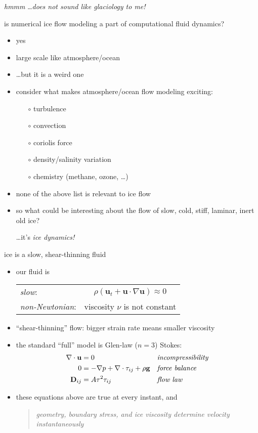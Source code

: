 \begin{frame}{\emph{hmmm} \dots \emph{does not sound like glaciology to me!}}

is numerical ice flow modeling a part of computational fluid dynamics?

\begin{itemize}
\item \alert{yes}
\item large scale like atmosphere/ocean
\item \dots but it is a weird one
\item consider what makes atmosphere/ocean flow modeling exciting:
  \begin{itemize}
  \item[$\circ$] turbulence
  \item[$\circ$] convection
  \item[$\circ$] coriolis force
  \item[$\circ$] density/salinity variation
  \item[$\circ$] chemistry (methane, ozone, \dots)
  \end{itemize}
\item none of the above list is relevant to ice flow
\item so what could be interesting about the flow of slow, cold, stiff, laminar, inert old ice?

 \qquad \dots \qquad it's \emph{ice dynamics!}
\end{itemize}
\end{frame}


\begin{frame}{ice is a slow, shear-thinning fluid}

\begin{itemize}
\item our fluid is

  \begin{tabular}{lc}
  \emph{slow}: & $\rho \left(\mathbf{u}_t + \mathbf{u}\cdot\nabla \mathbf{u}\right) \approx 0$ \\
  \emph{non-Newtonian}: & viscosity $\nu$ is not constant
  \end{tabular}
\item ``shear-thinning'' flow: bigger strain rate means smaller viscosity
\item the standard ``full'' model is Glen-law ($n=3$) Stokes:
\begin{align*}
\nabla \cdot \mathbf{u} &= 0 &&\text{\emph{incompressibility}} \\
0 &= - \nabla p + \nabla \cdot \tau_{ij} + \rho \mathbf{g} &&\text{\emph{force balance}} \\
\mathbf{D}_{ij} &= A \tau^2 \tau_{ij} &&\text{\emph{flow law}}
\end{align*}
\item these equations above are true at every instant, and
  \begin{quote}
  \emph{geometry, boundary stress, and ice viscosity determine velocity instantaneously}
  \end{quote}
\end{itemize}
\end{frame}


